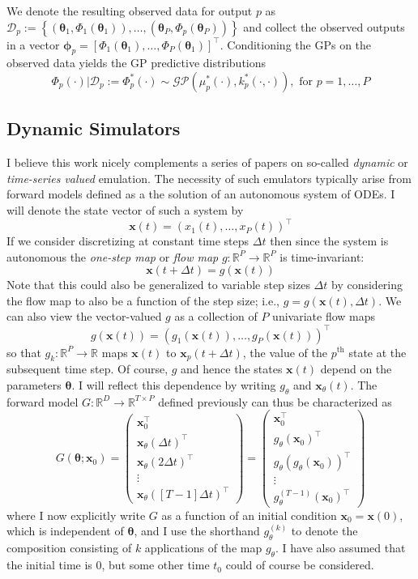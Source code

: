 \documentclass[12pt]{article}
\newcommand{\R}{\mathbb{R}}
\newcommand{\btheta}{\boldsymbol{\theta}}
\newcommand{\bx}{\mathbf{x}}
\begin{document}
We denote the resulting observed data for output $p$ as 
$\mathcal{D}_p := \left\{(\btheta_1, \Phi_1(\btheta_1)), \dots, (\btheta_P, \Phi_p(\btheta_P))  \right\}$ and collect the observed outputs in a vector 
$\boldsymbol{\phi}_p = \left[\Phi_1(\btheta_1), \dots, \Phi_P(\btheta_1) \right]^{\top}$. Conditioning the GPs on the observed data yields the GP predictive distributions 
\[\Phi_p(\cdot)|\mathcal{D}_p := \Phi_p^*(\cdot) \sim \mathcal{GP}(\mu^*_p(\cdot), k_p^*(\cdot, \cdot)), \text{ for } p = 1, \dots, P\]

\subsection{Dynamic Simulators}
I believe this work nicely complements a series of papers on so-called \textit{dynamic} or \textit{time-series valued} emulation. The necessity of such emulators typically arise from forward models 
defined as a the solution of an autonomous system of ODEs. I will denote the state vector of such a system by 
\[\bx(t) = \left(x_1(t), \dots, x_P(t) \right)^{\top} \]
If we consider discretizing at constant time steps $\Delta t$ then since the system is autonomous the \textit{one-step map} or \textit{flow map} $g: \R^P \to \R^P$ is time-invariant: 
 \[\bx(t + \Delta t) = g(\bx(t))\]
 Note that this could also be generalized to variable step sizes $\Delta t$ by considering the flow map to also be a function of the step size; i.e., $g = g(\bx(t), \Delta t)$. We can also view the 
 vector-valued $g$ as a collection of $P$ univariate flow maps
 \[g(\bx(t)) = \left(g_1(\bx(t)), \dots, g_P(\bx(t)) \right)^{\top}\]
 so that $g_k: \R^P \to \R$ maps $\bx(t)$ to $\bx_p(t + \Delta t)$, the value of the $p^{\text{th}}$ state at the subsequent time step. Of course, $g$ and hence the states $\bx(t)$ depend on 
 the parameters $\btheta$. I will reflect this dependence by writing $g_\theta$ and $\bx_\theta(t)$. The forward model $G: \R^D \to \R^{T \times P}$ defined previously can thus be characterized 
 as 
 \[
 G(\btheta; \bx_0) = \begin{pmatrix} \bx_0^{\top} \\ \bx_\theta(\Delta t)^{\top} \\  \bx_\theta(2\Delta t)^{\top} \\ \vdots \\ \bx_\theta\left([T-1]\Delta t\right)^{\top} \end{pmatrix} = 
 \begin{pmatrix} \bx_0^{\top} \\ g_\theta(\bx_0)^{\top} \\  g_\theta\left(g_\theta(\bx_0)\right)^{\top} \\ \vdots \\ g_\theta^{(T-1)}(\bx_0)^{\top} \end{pmatrix}
 \]
 where I now explicitly write $G$ as a function of an initial condition $\bx_0 = \bx(0)$, which is independent of $\btheta$, and I use the shorthand $g_\theta^{(k)}$ to denote 
 the composition consisting of $k$ applications of the map $g_\theta$. I have also assumed that the initial time is $0$, but 
 some other time $t_0$ could of course be considered. 
\end{document}
